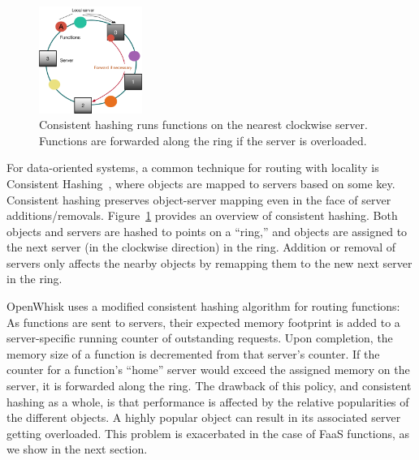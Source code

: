 \begin{figure}
  \centering 
  \includegraphics[width=0.3\textwidth]{../figs/ch-bl.pdf}
  \caption{Consistent hashing runs functions on the nearest clockwise server. Functions are forwarded along the ring if the server is overloaded.}
  \label{fig:ch}
\end{figure}

For data-oriented systems, a common technique for routing with locality is Consistent Hashing~\cite{karger1999web, karger1997consistent}, where objects are mapped to servers based on some key.
Consistent hashing preserves object-server mapping even in the face of server additions/removals. %
%
Figure~\ref{fig:ch} provides an overview of consistent hashing. Both objects and servers are hashed to points on a ``ring,'' and objects are assigned to the next server (in the clockwise direction) in the ring. 
Addition or removal of servers only affects the nearby objects by remapping them to the new next server in the ring.

OpenWhisk uses a modified consistent hashing algorithm for routing functions:
As functions are sent to servers, their expected memory footprint is added to a server-specific running counter of outstanding requests.
Upon completion, the memory size of a function is decremented from that server's counter.
If the counter for a function's ``home'' server would exceed the assigned memory on the server, it is forwarded along the ring.
%
The drawback of this policy, and consistent hashing as a whole, is that performance is affected by the relative popularities of the different objects.
A highly popular object can result in its associated server getting overloaded.
This problem is exacerbated in the case of FaaS functions, as we show in the next section. 


